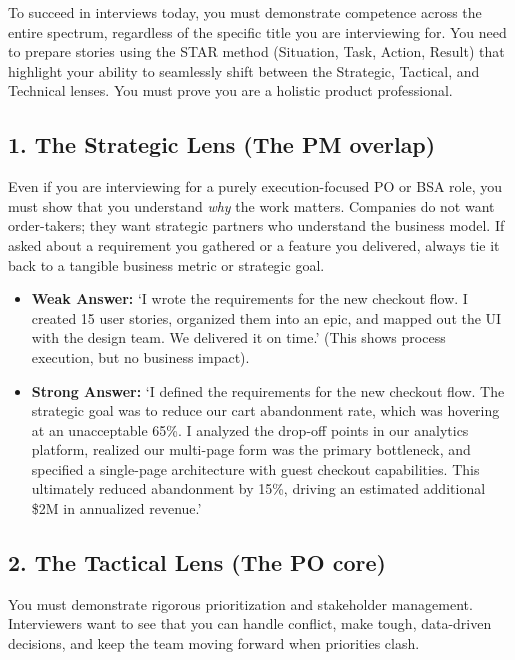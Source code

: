 To succeed in interviews today, you must demonstrate competence across
the entire spectrum, regardless of the specific title you are
interviewing for. You need to prepare stories using the STAR method
(Situation, Task, Action, Result) that highlight your ability to
seamlessly shift between the Strategic, Tactical, and Technical lenses.
You must prove you are a holistic product professional.

\subsection{1. The Strategic Lens (The PM
overlap)}\label{the-strategic-lens-the-pm-overlap}

Even if you are interviewing for a purely execution-focused PO or BSA
role, you must show that you understand \emph{why} the work matters.
Companies do not want order-takers; they want strategic partners who
understand the business model. If asked about a requirement you gathered
or a feature you delivered, always tie it back to a tangible business
metric or strategic goal.

\begin{itemize}
\tightlist
\item
  \textbf{Weak Answer:} `I wrote the requirements for the new checkout
  flow. I created 15 user stories, organized them into an epic, and
  mapped out the UI with the design team. We delivered it on time.'
  (This shows process execution, but no business impact).
\item
  \textbf{Strong Answer:} `I defined the requirements for the new
  checkout flow. The strategic goal was to reduce our cart abandonment
  rate, which was hovering at an unacceptable 65\%. I analyzed the
  drop-off points in our analytics platform, realized our multi-page
  form was the primary bottleneck, and specified a single-page
  architecture with guest checkout capabilities. This ultimately reduced
  abandonment by 15\%, driving an estimated additional \$2M in
  annualized revenue.'
\end{itemize}

\subsection{2. The Tactical Lens (The PO
core)}\label{the-tactical-lens-the-po-core}

You must demonstrate rigorous prioritization and stakeholder management.
Interviewers want to see that you can handle conflict, make tough,
data-driven decisions, and keep the team moving forward when priorities
clash.

